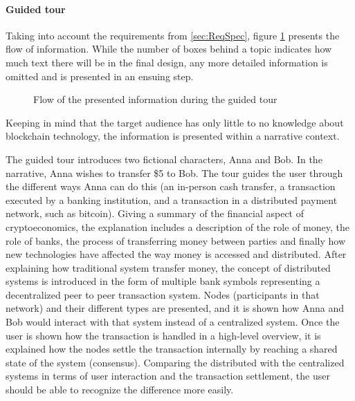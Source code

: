 \paragraph{Guided tour} Taking into account the requirements from \ref{sec:ReqSpec}, figure \ref{fig:DesignConcept} presents the flow of information. %
While the number of boxes behind a topic indicates how much text there will be in the final design, any more detailed information is omitted and is presented in an ensuing step. 

\begin{figure}
 \centering
 
 \caption{Flow of the presented information during the guided tour}
    \label{fig:DesignConcept}
\end{figure}

Keeping in mind that the target audience has only little to no knowledge about blockchain technology, the information is presented within a narrative context.

The guided tour introduces two fictional characters, Anna and Bob. In the narrative, Anna wishes to transfer \$5 to Bob. The tour guides the user through the different ways Anna can do this (an in-person cash transfer, a transaction executed by a banking institution, and a transaction in a distributed payment network, such as bitcoin). Giving a summary of the financial aspect of cryptoeconomics, the explanation includes a description of the role of money, the role of banks, the process of transferring money between parties and finally how new technologies have affected the way money is accessed and distributed. After explaining how traditional system transfer money, the concept of distributed systems is introduced in the form of multiple bank symbols representing a decentralized peer to peer transaction system. Nodes (participants in that network) and their different types are presented, and it is shown how Anna and Bob would interact with that system instead of a centralized system. Once the user is shown how the transaction is handled in a high-level overview, it is explained how the nodes settle the transaction internally by reaching a shared state of the system (consensus).
Comparing the distributed with the centralized systems in terms of user interaction and the transaction settlement, the user should be able to recognize the difference more easily.

